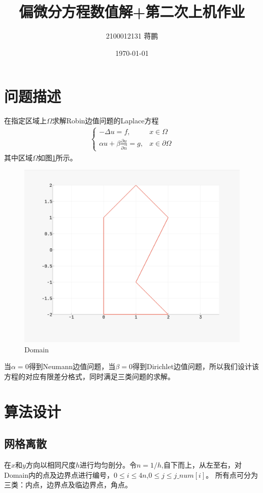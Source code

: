 \documentclass[11pt,a4 paper,one side]{article}
\title{偏微分方程数值解+第二次上机作业}
\author{2100012131 蒋鹏}
\date{\today}
\begin{document}
\maketitle
\tableofcontents
\section{问题描述}
在指定区域上$\Omega$求解Robin边值问题的Laplace方程
\begin{align}
\begin{cases}
    -\Delta u=f, &x\in \Omega \\
    \alpha  u+\beta  \frac{\partial u}{\partial \vec{n}}=g, &x\in \partial \Omega
\end{cases}
\end{align}
其中区域$\Omega$如图\ref{Domain}所示。\begin{figure}
    \centering
    \includegraphics[width=0.9\linewidth]{Domain.png}
    \caption{Domain}
    \label{Domain}
\end{figure}
当$\alpha=0$得到Neumann边值问题，当$\beta=0$得到Dirichlet边值问题，所以我们设计该方程的对应有限差分格式，同时满足三类问题的求解。
\section{算法设计}
\subsection{网格离散}
在$x$和$y$方向以相同尺度$h$进行均匀剖分。令$n=1/h$,自下而上，从左至右，对Domain内的点及边界点进行编号，$0\leq i \leq 4n$,$0\leq j \leq j\_num[i]$。
所有点可分为三类：内点，边界点及临边界点，角点。
\end{document}
